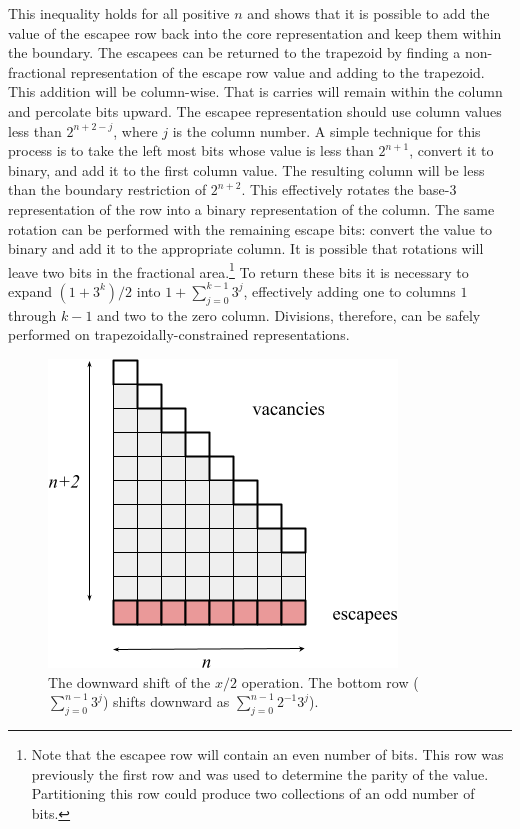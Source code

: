 \documentclass{article}
\begin{document}
This inequality holds for all positive $n$ and shows that it is possible to add
the value of the escapee row back into the core representation and keep them
within the boundary. The escapees can be returned to the trapezoid by finding a
non-fractional representation of the escape row value and adding to the
trapezoid. This addition will be column-wise. That is carries will remain within
the column and percolate bits upward. The escapee representation should
use column values less than $2^{n+2-j}$, where $j$ is the column number.
A simple technique for this process
is to take the left most bits whose value is less than $2^{n+1}$, convert it to
binary, and add it to the first column value. The resulting column will be less
than the boundary restriction of $2^{n+2}$. This effectively rotates the base-$3$
representation of the row into a binary representation of the column.
The same rotation can be performed
with the remaining escape bits: convert the value to binary and add it to the
appropriate column.  It is possible that rotations will leave two bits in the
fractional area.\footnote{Note that the escapee row will contain an
even number of bits. This row was previously the first row and was used to determine
the parity of the value.  Partitioning this row could produce two collections of
an odd number of bits.} To return these bits it is necessary to expand $(1+3^k)/2$
into $1 + \sum_{j=0}^{k-1}3^j$, effectively adding one to columns $1$ through
$k-1$ and two to the zero column.  Divisions, therefore, can be safely performed
on trapezoidally-constrained representations.

\begin{figure}[H]
  \begin{center}
    \includegraphics[scale=0.5]{"Images/division_bold"}
  \end{center}
  \caption{The downward shift of the $x/2$ operation. The bottom row ($\sum_{j=0}^{n-1}3^j$)
    shifts downward as $\sum_{j=0}^{n-1}2^{-1}3^j$).}
  \label{fig:divide}
\end{figure}
\end{document}
